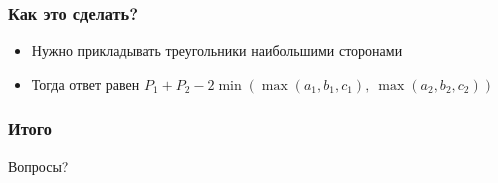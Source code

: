 \begin{frame}
  \frametitle{Как это сделать?}
  \begin{itemize}
    \item
      Нужно прикладывать треугольники наибольшими сторонами
    \item
			Тогда ответ равен $P_1 + P_2 - 2\min(\max(a_1, b_1, c_1), \ \max(a_2, b_2, c_2)) $
  \end{itemize}
\end{frame}

\begin{frame}
  \frametitle{Итого}
  Вопросы?
\end{frame}
